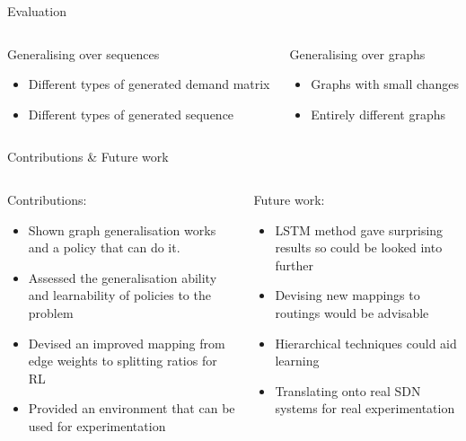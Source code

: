 \documentclass{beamer}
\begin{document}
\begin{frame}{Evaluation}
\begin{columns}
  \begin{column}{0.5\textwidth}
    Generalising over sequences
    \begin{itemize}
      \item Different types of generated demand matrix
      \item Different types of generated sequence
    \end{itemize}
    \resizebox{\textwidth}{!}{}
  \end{column}
  \begin{column}{0.5\textwidth}
    Generalising over graphs
    \begin{itemize}
      \item Graphs with small changes
      \item Entirely different graphs
    \end{itemize}
    \vspace{\baselineskip}
    \vspace{\baselineskip}
    \resizebox{\textwidth}{!}{}
  \end{column}
\end{columns}
\end{frame}

\begin{frame}{Contributions \& Future work}
\begin{columns}
  \begin{column}{0.5\textwidth}
    Contributions:
    \begin{itemize}
      \item Shown graph generalisation works and a policy that can do it.
      \item Assessed the generalisation ability and learnability of policies to the problem
      \item Devised an improved mapping from edge weights to splitting ratios for RL
      \item Provided an environment that can be used for experimentation
    \end{itemize}
  \end{column}
  \begin{column}{0.5\textwidth}
    Future work:
    \begin{itemize}
      \item LSTM method gave surprising results so could be looked into further
      \item Devising new mappings to routings would be advisable
      \item Hierarchical techniques could aid learning
      \item Translating onto real SDN systems for real experimentation
    \end{itemize}
    \vspace{\baselineskip}
    \vspace{0.9\baselineskip}
  \end{column}
\end{columns}
\end{frame}
\end{document}
